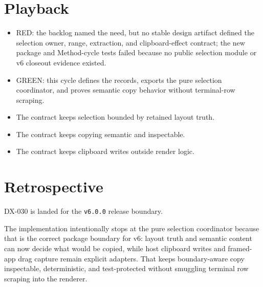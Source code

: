 \section{Playback}\label{record-127-playback}

\begin{itemize}
\tightlist
\item
  RED: the backlog named the need, but no stable design artifact defined the selection owner, range, extraction, and clipboard-effect contract; the new package and Method-cycle tests failed because no public selection module or v6 closeout evidence existed.
\item
  GREEN: this cycle defines the records, exports the pure selection coordinator, and proves semantic copy behavior without terminal-row scraping.
\item
  The contract keeps selection bounded by retained layout truth.
\item
  The contract keeps copying semantic and inspectable.
\item
  The contract keeps clipboard writes outside render logic.
\end{itemize}

\section{Retrospective}\label{record-127-retrospective}

DX-030 is landed for the \texttt{v\allowbreak{}6\allowbreak{}.\allowbreak{}0\allowbreak{}.\allowbreak{}0} release boundary.

The implementation intentionally stops at the pure selection coordinator because that is the correct package boundary for v6: layout truth and semantic content can now decide what would be copied, while host clipboard writes and framed-app drag capture remain explicit adapters. That keeps boundary-aware copy inspectable, deterministic, and test-protected without smuggling terminal row scraping into the renderer.

